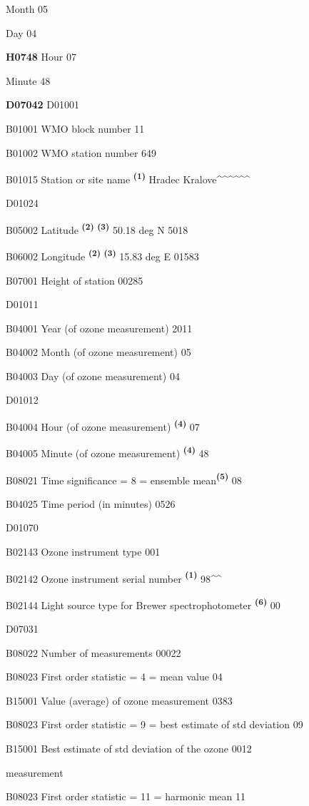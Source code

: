 Month 05

Day 04

\textbf{H0748} Hour 07

Minute 48

\textbf{D07042} D01001

B01001 WMO block number 11

B01002 WMO station number 649

B01015 Station or site name \textbf{\textsuperscript{(1)}} Hradec Kralove\^{}\^{}\^{}\^{}\^{}\^{}

D01024

B05002 Latitude \textbf{\textsuperscript{(2) (3)}} 50.18 deg N 5018

B06002 Longitude \textbf{\textsuperscript{(2) (3)}} 15.83 deg E 01583

B07001 Height of station 00285

D01011

B04001 Year (of ozone measurement) 2011

B04002 Month (of ozone measurement) 05

B04003 Day (of ozone measurement) 04

D01012

B04004 Hour (of ozone measurement) \textbf{\textsuperscript{(4)}} 07

B04005 Minute (of ozone measurement) \textbf{\textsuperscript{(4)}} 48

B08021 Time significance = 8 = ensemble mean\textbf{\textsuperscript{(5)}} 08

B04025 Time period (in minutes) 0526

D01070

B02143 Ozone instrument type 001

B02142 Ozone instrument serial number \textbf{\textsuperscript{(1)}} 98\^{}\^{}

B02144 Light source type for Brewer spectrophotometer \textbf{\textsuperscript{(6)}} 00

D07031

B08022 Number of measurements 00022

B08023 First order statistic = 4 = mean value 04

B15001 Value (average) of ozone measurement 0383

B08023 First order statistic = 9 = best estimate of std deviation 09

B15001 Best estimate of std deviation of the ozone 0012

measurement

B08023 First order statistic = 11 = harmonic mean 11

